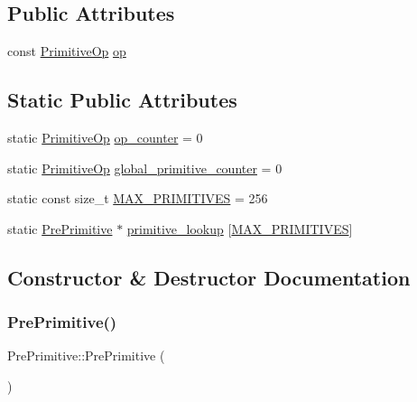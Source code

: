\subsection*{Public Attributes}
\begin{DoxyCompactItemize}
\item 
const \hyperlink{_instruction_8h_a227278394efd1e2313c727102db09ea9}{Primitive\+Op} \hyperlink{struct_pre_primitive_a209912eb2296e524388fa1f83e7d834b}{op}
\end{DoxyCompactItemize}
\subsection*{Static Public Attributes}
\begin{DoxyCompactItemize}
\item 
static \hyperlink{_instruction_8h_a227278394efd1e2313c727102db09ea9}{Primitive\+Op} \hyperlink{struct_pre_primitive_a8f4088dc0a3fe00fd81c509bb0af1881}{op\+\_\+counter} = 0
\item 
static \hyperlink{_instruction_8h_a227278394efd1e2313c727102db09ea9}{Primitive\+Op} \hyperlink{struct_pre_primitive_a42ca9726dd60d24f8148e766d5e8ecc8}{global\+\_\+primitive\+\_\+counter} = 0
\item 
static const size\+\_\+t \hyperlink{struct_pre_primitive_aaa931d0f215c4a79ab4920c13a82a32b}{M\+A\+X\+\_\+\+P\+R\+I\+M\+I\+T\+I\+V\+ES} = 256
\item 
static \hyperlink{struct_pre_primitive}{Pre\+Primitive} $\ast$ \hyperlink{struct_pre_primitive_a286cab59ea91d634e75f435cd9812dd1}{primitive\+\_\+lookup} \mbox{[}\hyperlink{struct_pre_primitive_aaa931d0f215c4a79ab4920c13a82a32b}{M\+A\+X\+\_\+\+P\+R\+I\+M\+I\+T\+I\+V\+ES}\mbox{]}
\end{DoxyCompactItemize}


\subsection{Constructor \& Destructor Documentation}
\mbox{\label{struct_pre_primitive_a8a96c30ad34b1f19f0539eea4d0423f6}} 
\subsubsection{\texorpdfstring{Pre\+Primitive()}{PrePrimitive()}}
{\footnotesize\ttfamily Pre\+Primitive\+::\+Pre\+Primitive (\begin{DoxyParamCaption}{ }\end{DoxyParamCaption})\hspace{0.3cm}{\ttfamily [inline]}}



